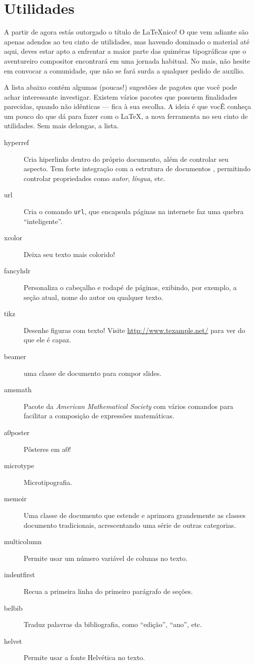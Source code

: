 \section{Utilidades}

A partir de agora estás outorgado o título de \LaTeX nico! O que vem
adiante são apenas adendos ao teu cinto de utilidades, mas havendo
dominado o material até aqui, deves estar apto a enfrentar a maior
parte das quiméras tipográficas que o aventureiro compositor
encontrará em uma jornada habitual. No mais, não hesite em convocar a
comunidade, que não se fará surda a qualquer pedido de auxílio.

A lista abaixo contém algumas (poucas!) sugestões de pagotes que você pode achar
interessante investigar. Existem vários pacotes que possuem
finalidades parecidas, quando não idênticas --- fica à sua escolha. A
ideia é que vocÊ conheça um pouco do que dá para fazer com o \LaTeX, a
nova ferramenta no seu cinto de utilidades. Sem mais delongas, a
lista.

\begin{description}
  \item[hyperref] Cria hiperlinks dentro do
    próprio documento, além de controlar seu aspecto. Tem forte
    integração com a estrutura de documentos ,
    permitindo controlar propriedades como \emph{autor},
    \emph{língua}, etc.
  \item[url] Cria o comando \verb'url', que encapsula páginas na
    internete faz uma quebra ``inteligente''.
  \item[xcolor] Deixa seu texto mais colorido!
  \item[fancyhdr] Personaliza o cabeçalho e rodapé de páginas,
    exibindo, por exemplo, a seção atual, nome do autor ou qualquer
    texto.
  \item[tikz] Desenhe figuras com texto! Visite
    \url{http://www.texample.net/} para ver do que ele é capaz.
  \item[beamer] uma classe de documento para compor slides.
  \item[amsmath] Pacote da \emph{American Mathematical Society} com
    vários comandos para facilitar a composição de expressões
    matemáticas.
  \item[a0poster] Pôsteres em a0!
  \item[microtype] Microtipografia.
  \item[memoir] Uma classe de documento que estende e aprimora
    grandemente as classes documento tradicionais, acrescentando uma
    série de outras categorias.
  \item[multicolumn] Permite usar um número variável de colunas no
    texto.
  \item[indentfirst] Recua a primeira linha do primeiro parágrafo de
    seções.
  \item[belbib] Traduz palavras da bibliografia, como ``edição'',
  ``ano'', etc.
  \item[helvet] Permite usar a fonte Helvética no texto. 
\end{description}
